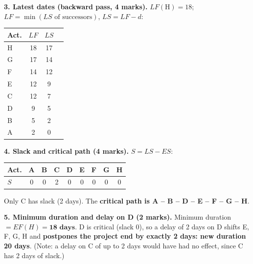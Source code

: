 \documentclass[11pt]{article}
\begin{document}
\begin{corrige}
\textbf{3. Latest dates (backward pass, 4 marks).} $LF(\text{H}) = 18$; $LF = \min(LS \text{ of successors})$, $LS = LF - d$:
\begin{center}
\begin{tabular}{|l|c|c|c|}\hline
\rowcolor{popblueL} \textbf{Act.} & $LF$ & $LS$ & \\ \hline
H & 18 & 17 & \\ \hline
G & 17 & 14 & \\ \hline
F & 14 & 12 & \\ \hline
E & 12 & 9 & \\ \hline
C & 12 & 7 & \\ \hline
D & 9 & 5 & \\ \hline
B & 5 & 2 & \\ \hline
A & 2 & 0 & \\ \hline
\end{tabular}
\end{center}

\textbf{4. Slack and critical path (4 marks).} $S = LS - ES$:
\begin{center}
\begin{tabular}{|l|c|c|c|c|c|c|c|c|}\hline
\rowcolor{popblueL} \textbf{Act.} & A & B & C & D & E & F & G & H \\ \hline
$S$ & 0 & 0 & 2 & 0 & 0 & 0 & 0 & 0 \\ \hline
\end{tabular}
\end{center}
Only C has slack (2 days). The \textbf{critical path is A -- B -- D -- E -- F -- G -- H}.

\textbf{5. Minimum duration and delay on D (2 marks).} Minimum duration $= EF(H) = \textbf{18 days}$. D is critical (slack 0), so a delay of 2 days on D shifts E, F, G, H and \textbf{postpones the project end by exactly 2 days: new duration 20 days}. (Note: a delay on C of up to 2 days would have had no effect, since C has 2 days of slack.)
\end{corrige}
\end{document}

